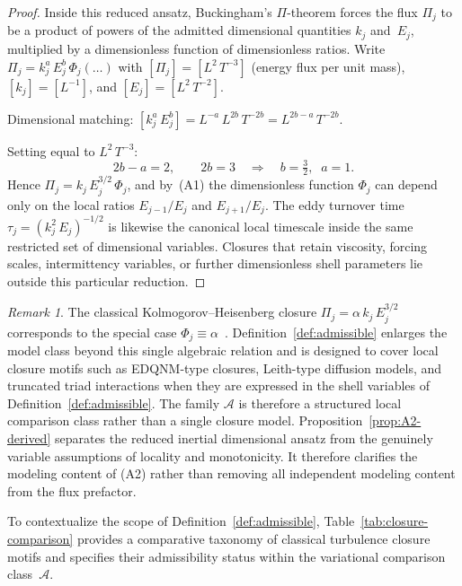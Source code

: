 \documentclass[12pt,a4paper]{article}
\theoremstyle{definition}
\theoremstyle{plain}
\theoremstyle{remark}
\newtheorem{remark}[definition]{Remark}
\begin{document}
\begin{proof}
Inside this reduced ansatz, Buckingham's $\Pi$-theorem forces the flux
$\Pi_j$ to be a product of powers of the admitted dimensional quantities
$k_j$ and~$E_j$, multiplied by a dimensionless function of dimensionless
ratios. Write $\Pi_j = k_j^{a}\,E_j^{b}\,\Phi_j(\ldots)$ with
$[\Pi_j] = [L^2\,T^{-3}]$ (energy flux per unit mass),
$[k_j] = [L^{-1}]$, and $[E_j] = [L^2\,T^{-2}]$.

Dimensional matching: $[k_j^a\,E_j^b] = L^{-a}\,L^{2b}\,T^{-2b} = L^{2b-a}\,T^{-2b}$.

Setting equal to $L^2\,T^{-3}$:
\[
2b - a = 2, \qquad 2b = 3 \quad\Longrightarrow\quad b = \tfrac{3}{2},\;\; a = 1.
\]
Hence $\Pi_j = k_j\,E_j^{3/2}\,\Phi_j$, and by~(A1) the dimensionless
function $\Phi_j$ can depend only on the local ratios $E_{j-1}/E_j$ and
$E_{j+1}/E_j$. The eddy turnover time
$\tau_j = (k_j^2\,E_j)^{-1/2}$ is likewise the canonical local timescale
inside the same restricted set of dimensional variables.  Closures that
retain viscosity, forcing scales, intermittency variables, or further
dimensionless shell parameters lie outside this particular reduction.
\end{proof}

\begin{remark}
The classical Kolmogorov--Heisenberg closure $\Pi_j = \alpha\,k_j\,E_j^{3/2}$
corresponds to the special case $\Phi_j \equiv \alpha$~\cite{MY75}.  Definition~\ref{def:admissible}
enlarges the model class beyond this single algebraic relation and is
designed to cover local closure motifs such as EDQNM-type closures,
Leith-type diffusion models, and truncated triad interactions when they
are expressed in the shell variables of Definition~\ref{def:admissible}.
The family $\mathscr{A}$ is therefore a structured local comparison class
rather than a single closure model.
Proposition~\ref{prop:A2-derived} separates the reduced inertial
dimensional ansatz from the genuinely variable assumptions of locality
and monotonicity.  It therefore clarifies the modeling content of (A2)
rather than removing all independent modeling content from the flux
prefactor.
\end{remark}

To contextualize the scope of Definition~\ref{def:admissible}, Table~\ref{tab:closure-comparison} provides a comparative taxonomy of classical turbulence closure motifs and specifies their admissibility status within the variational comparison class~$\mathscr{A}$.
\end{document}
